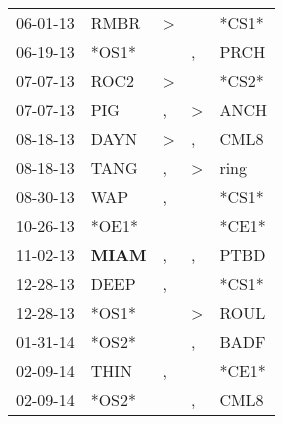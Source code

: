 \begin{supertabular}{p{0.07\textwidth}p{0.06\textwidth}p{0.02\textwidth}p{0.02\textwidth}p{0.06\textwidth}}
          06-01-13\textsuperscript{} &           RMBR\textsuperscript{} &     \textgreater &                  &                            *CS1* \\
          06-19-13\textsuperscript{} &                            *OS1* &                  &                , &           PRCH\textsuperscript{} \\
          07-07-13\textsuperscript{} &           ROC2\textsuperscript{} &     \textgreater &                  &                            *CS2* \\
          07-07-13\textsuperscript{} &            PIG\textsuperscript{} &                , &     \textgreater &           ANCH\textsuperscript{} \\
          08-18-13\textsuperscript{} &           DAYN\textsuperscript{} &     \textgreater &                , &           CML8\textsuperscript{} \\
          08-18-13\textsuperscript{} &           TANG\textsuperscript{} &                , &     \textgreater &           ring\textsuperscript{} \\
          08-30-13\textsuperscript{} &            WAP\textsuperscript{} &                , &                  &                            *CS1* \\
          10-26-13\textsuperscript{} &                            *OE1* &                  &                  &                            *CE1* \\
          11-02-13\textsuperscript{} &  \textbf{MIAM\textsuperscript{}} &                , &                , &           PTBD\textsuperscript{} \\
          12-28-13\textsuperscript{} &           DEEP\textsuperscript{} &                , &                  &                            *CS1* \\
          12-28-13\textsuperscript{} &                            *OS1* &                  &     \textgreater &           ROUL\textsuperscript{} \\
          01-31-14\textsuperscript{} &                            *OS2* &                  &                , &           BADF\textsuperscript{} \\
          02-09-14\textsuperscript{} &           THIN\textsuperscript{} &                , &                  &                            *CE1* \\
          02-09-14\textsuperscript{} &                            *OS2* &                  &                , &           CML8\textsuperscript{} \\

\end{supertabular}
